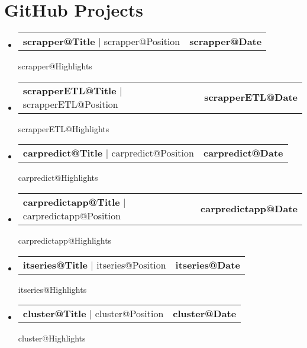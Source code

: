 \documentclass[letterpaper,11pt]{article}
\makeatletter
\newcommand{\resumeProjectHeading}[2]{
    \item
    \begin{tabular*}{1.001\textwidth}{l@{\extracolsep{\fill}}r}
      \small#1 & \textbf{\small #2}\\
    \end{tabular*}\vspace{-7pt}
}
\newcommand{\resumeSubHeadingListStart}{\begin{itemize}[leftmargin=0.0in, label={}]}
\newcommand{\resumeSubHeadingListEnd}{\end{itemize}}
\makeatother
\begin{document}
\newcommand{\renderHck}[1]{
      \resumeProjectHeading
      {\textbf{\csname #1@Title\endcsname} $|$ \csname #1@Position\endcsname}
      {\csname #1@Date\endcsname}
      \csname #1@Highlights\endcsname
}





\section{GitHub Projects}
\vspace{-5pt}
\resumeSubHeadingListStart
    \renderHck{scrapper}
    \vspace{-5pt}
    \renderHck{scrapperETL}
    \vspace{-5pt}
    \renderHck{carpredict}
    \vspace{-12pt}
    \renderHck{carpredictapp}
    \vspace{-12pt}
    \renderHck{itseries}
    \vspace{-12pt}
    \renderHck{cluster}
\resumeSubHeadingListEnd
\end{document}
